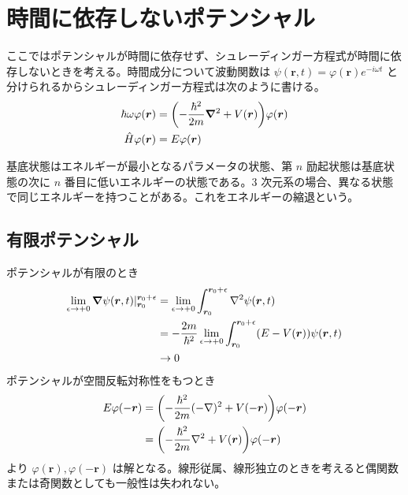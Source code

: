\documentclass[uplatex,dvipdfmx,a4paper,11pt]{jlreq}
\newcommand{\rr}{\bm{r}}
\numberwithin{equation}{section}
\theoremstyle{definition}
\begin{document}
\section{時間に依存しないポテンシャル}
ここではポテンシャルが時間に依存せず、シュレーディンガー方程式が時間に依存しないときを考える。時間成分について波動関数は $\psi(\rr, t) = \varphi(\rr)e^{-i\omega t}$ と分けられるからシュレーディンガー方程式は次のように書ける。
\begin{align}
  \hbar\omega\varphi(\rr) & = \qty(-\frac{\hbar^2}{2m}\vnabla^2 + V(\rr))\varphi(\rr) \\
  \hat{H}\varphi(\rr)     & = E\varphi(\rr)
\end{align}

\begin{definition}[エネルギーの縮退]
  基底状態はエネルギーが最小となるパラメータの状態、第 $n$ 励起状態は基底状態の次に $n$ 番目に低いエネルギーの状態である。3 次元系の場合、異なる状態で同じエネルギーを持つことがある。これをエネルギーの縮退という。
\end{definition}

\subsection{有限ポテンシャル}
ポテンシャルが有限のとき
\begin{align}
  \lim_{\epsilon\to +0}\vnabla\psi(\rr, t)|_{\rr_0}^{\rr_0 + \epsilon} & = \lim_{\epsilon\to +0}\int_{\rr_0}^{\rr_0 + \epsilon}\nabla^2\psi(\rr, t)                        \\
                                                                       & = -\frac{2m}{\hbar^2}\lim_{\epsilon\to +0}\int_{\rr_0}^{\rr_0 + \epsilon}(E - V(\rr))\psi(\rr, t) \\
                                                                       & \to 0
\end{align}
ポテンシャルが空間反転対称性をもつとき
\begin{align}
  E\varphi(-\rr) & = \qty(-\frac{\hbar^2}{2m}(-\nabla)^2 + V(-\rr))\varphi(-\rr) \\
                 & = \qty(-\frac{\hbar^2}{2m}\nabla^2 + V(\rr))\varphi(-\rr)
\end{align}
より $\varphi(\rr), \varphi(-\rr)$ は解となる。線形従属、線形独立のときを考えると偶関数または奇関数としても一般性は失われない。
\end{document}
